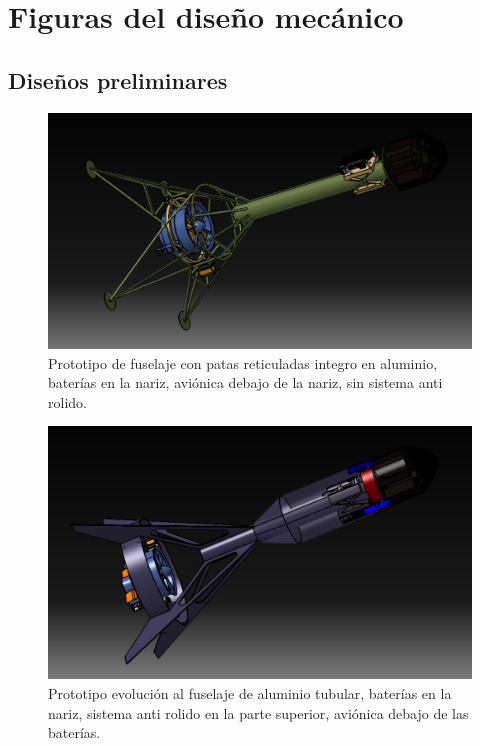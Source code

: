 \section{Figuras del diseño mecánico}
\subsection{Diseños preliminares}

\begin{figure}[htb]
    \centering
    \includegraphics[width=\linewidth]{fig/design/0}
    \caption{Prototipo de fuselaje con patas reticuladas integro en aluminio, baterías en la nariz, aviónica debajo de la nariz, sin sistema anti rolido.}
    \label{fig:design/0}
\end{figure}


\begin{figure}[htb]
    \centering
    \includegraphics[width=\linewidth]{fig/design/1}
    \caption{Prototipo evolución al fuselaje de aluminio tubular, baterías en la nariz, sistema anti rolido en
    la parte superior, aviónica debajo de las baterías.}
    \label{fig:design/1}
\end{figure}

